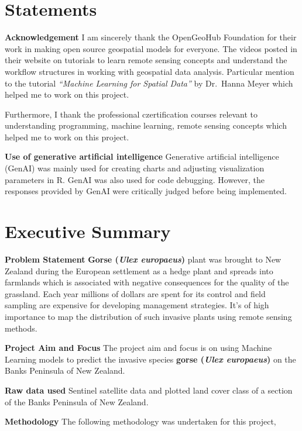 \documentclass[
]{article}
\begin{document}
\section{Statements}\label{statements}

\textbf{Acknowledgement} I am sincerely thank the OpenGeoHub Foundation
for their work in making open source geospatial models for everyone. The
videos posted in their website on tutorials to learn remote sensing
concepts and understand the workflow structures in working with
geospatial data analysis. Particular mention to the tutorial
\emph{``Machine Learning for Spatial Data''} by Dr.~Hanna Meyer which
helped me to work on this project.

Furthermore, I thank the professional czertification courses relevant to
understanding programming, machine learning, remote sensing concepts
which helped me to work on this project.

\textbf{Use of generative artificial intelligence} Generative artificial
intelligence (GenAI) was mainly used for creating charts and adjusting
visualization parameters in R. GenAI was also used for code debugging.
However, the responses provided by GenAI were critically judged before
being implemented.

\section{Executive Summary}\label{executive-summary}

\textbf{Problem Statement} \textbf{Gorse (\emph{Ulex europaeus})} plant
was brought to New Zealand during the European settlement as a hedge
plant and spreads into farmlands which is associated with negative
consequences for the quality of the grassland. Each year millions of
dollars are spent for its control and field sampling are expensive for
developing management strategies. It's of high importance to map the
distribution of such invasive plants using remote sensing methods.

\textbf{Project Aim and Focus} The project aim and focus is on using
Machine Learning models to predict the invasive species \textbf{gorse
(\emph{Ulex europaeus})} on the Banks Peninsula of New Zealand.

\textbf{Raw data used} Sentinel satellite data and plotted land cover
class of a section of the Banks Peninsula of New Zealand.

\textbf{Methodology} The following methodology was undertaken for this
project,
\end{document}
